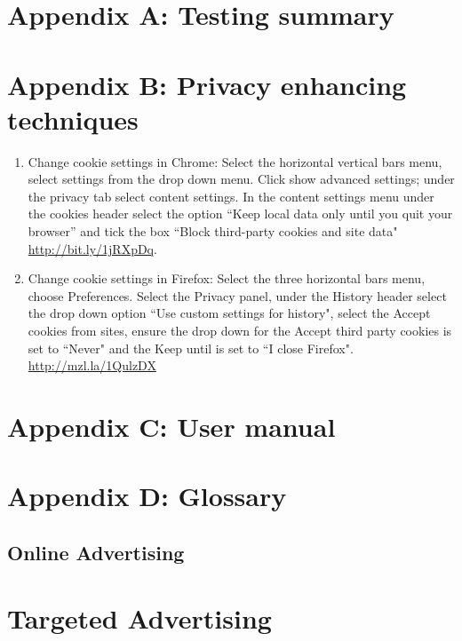 \documentclass[12pt]{article}
\begin{document}
\section{Appendix A: Testing summary}

\section{Appendix B: Privacy enhancing techniques} \label{appendixA}
\begin{enumerate}
    \item Change cookie settings in Chrome: Select the horizontal vertical bars menu, select settings from the drop down menu. Click show advanced settings; under the privacy tab select content settings. In the content settings menu under the cookies header select the option ``Keep local data only until you quit your browser'' and tick the box ``Block third-party cookies and site data" \url{http://bit.ly/1jRXpDq}. 
    \item Change cookie settings in Firefox: Select the three horizontal bars menu, choose Preferences. Select the Privacy panel, under the History header select the drop down option ``Use custom settings for history", select the Accept cookies from sites, ensure the drop down for the Accept third party cookies is set to ``Never" and the Keep until is set to ``I close Firefox". \url{http://mzl.la/1QulzDX} 
\end{enumerate}

\section{Appendix C: User manual}

\section{Appendix D: Glossary}
\subsection{Online Advertising}

\section{Targeted Advertising}
\end{document}
